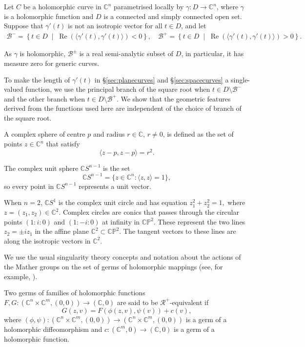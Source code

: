 \documentclass[12pt,a4paper]{article}
\begin{document}
Let $C$ be a holomorphic curve in $\mathbb C^n$ parametrised locally by $\gamma: D\to \mathbb C^n$, where $\gamma$ is a holomorphic function and $D$ is a connected and simply connected open set.  Suppose that $\gamma'(t)$ is not an isotropic vector for all $t\in D$, and let 
\begin{align}\label{setB}
\mathcal{B}^- = \left\{ t \in D \; \middle| \; \operatorname{Re} (\langle \gamma'(t), {\gamma'(t)} \rangle ) < 0 \right\},\quad 
\mathcal{B}^+ = \left\{ t \in D \; \middle| \; \operatorname{Re} (\langle \gamma'(t), {\gamma'(t)} \rangle ) > 0 \right\}.
\end{align}

As $\gamma$ is holomorphic, $\mathcal{B}^{\pm}$ is a real semi-analytic subset of $D$, in particular, it has measure zero for generic curves.

To make the length of $\gamma'(t)$ in \S\ref{sec:planecurves} and \S\ref{sec:spacecurves} a single-valued function, 
we use the principal branch of the square root when $t\in D\setminus \mathcal{B}^-$ and the other branch when $t\in D\setminus \mathcal{B}^+$. We show that the geometric features derived from the functions used here are independent of the choice of branch of the square root.

A complex sphere of centre $p$ and radius $r\in \mathbb C$, $r\ne 0$, is defined as the set of points $z\in \mathbb C^n$ that satisfy
$$
\langle z-p, {z-p}\rangle=r^2.
$$  

The complex unit sphere $\mathbb CS^{n-1}$ is the set 
$$
\mathbb CS^{n-1}=\{z\in \mathbb C^n: \langle z, {z}\rangle=1 \},
$$
so every point in $\mathbb CS^{n-1}$ represents a unit vector.

When $n=2$, $\mathbb CS^{1}$ is the complex unit circle and has 
equation 
$
z_1^2+z_2^2=1,
$ 
 where $z=(z_1,z_2)\in \mathbb C^2$.
Complex circles are conics that passes through 
the circular points $(1:i:0)$  and $(1:-i:0)$ at infinity in $\mathbb{CP}^2$. These 
represent the two lines
$z_2=\pm iz_1$ in the affine plane $\mathbb C^2\subset \mathbb{CP}^2$.
The tangent vectors to these lines are along the isotropic vectors in $\mathbb C^2$.

We use the usual singularity theory concepts and notation about the actions of the Mather groups on the set of germs of holomorphic mappings (see, for example, \cite{wallsurvey}). 

Two germs of families of holomorphic functions $F,G: (\mathbb C^n\times \mathbb C^m,(0,0))\to (\mathbb C,0 )$
are said to be $\mathcal R^+$-equivalent if 
$$
G(z,v)=F(\phi(z,v),\psi(v))+c(v),
$$ 
where $(\phi,\psi):(\mathbb C^n\times \mathbb C^m,(0,0))\to (\mathbb C^n\times \mathbb C^m,(0,0))$ is a germ of a holomorphic diffeomorphism and $c:(\mathbb C^m,0)\to (\mathbb C,0)$ is a germ of a holomorphic function.
\end{document}
